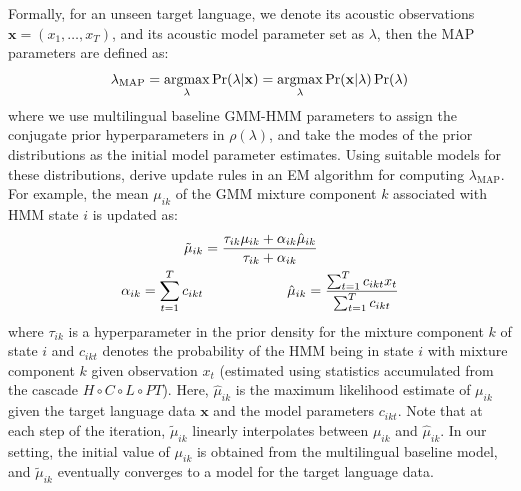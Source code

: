 Formally, for an unseen target language, we denote its acoustic observations $\mathbf{x}= ( x_1, \ldots, x_{T} )$, and its acoustic model parameter set as $\lambda$, then the MAP parameters are defined as:
%
\begin{equation}
    \lambda_{\mathrm{MAP}}  = \argmax_{\lambda} \Pr(\lambda | \mathbf{x}) 
= \argmax_{\lambda} \Pr( \mathbf{x} | \lambda ) \Pr(\lambda)
\label{eq:map}
\end{equation}
%
\noindent where we use multilingual baseline GMM-HMM parameters to assign the conjugate prior hyperparameters in $\rho(\lambda)$, and take the modes of the prior distributions as the initial model parameter estimates. Using suitable models for these distributions,  \cite{gauvain1994maximum} derive update rules in an EM algorithm for computing $\lambda_{\mathrm{MAP}}$. For example, the mean $\mu_{ik}$ of the GMM mixture component $k$ associated with HMM state $i$ is updated as:
\begin{align}
\tilde{\mu}_{ik} &= \frac{\tau_{ik} \mu_{ik} + \alpha_{ik} \hat{\mu}_{ik} }{\tau_{ik}  + \alpha_{ik}  } \\
\alpha_{ik}= \sum_{t=1}^{T} c_{ikt}  &\qquad\qquad\qquad
\hat{\mu}_{ik} = \frac{ \sum_{t=1}^{T} c_{ikt} x_t }{ \sum_{t=1}^{T} c_{ikt}  } \notag
\end{align}
where $\tau_{ik}$ is a hyperparameter in the prior density for the mixture component $k$ of state $i$  and $c_{ikt}$ denotes the probability of the HMM being in state $i$ with mixture component $k$ given observation $x_t$ (estimated using statistics accumulated from the cascade $H \circ C \circ L \circ PT$).  Here, $\hat{\mu}_{ik}$ is the maximum likelihood estimate of $\mu_{ik}$ given the target language data $\mathbf{x}$ and the model parameters $c_{ikt}$. Note that at each step of the iteration, $\tilde{\mu}_{ik}$ linearly interpolates between $\mu_{ik}$ and $\hat\mu_{ik}$.
In our setting,  the initial value of $\mu_{ik}$ is obtained from the multilingual baseline model, and $\tilde{\mu}_{ik}$ eventually converges to a model for the target language data.

